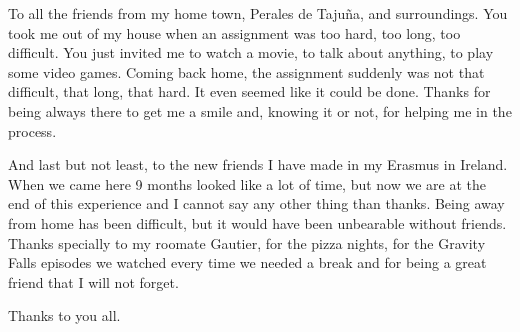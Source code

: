 To all the friends from my home town, Perales de Tajuña, and surroundings. You took me out of my house when an assignment was too hard, too long, too difficult. You just invited me to watch a movie, to talk about anything, to play some video games. Coming back home, the assignment suddenly was not that difficult, that long, that hard. It even seemed like it could be done. Thanks for being always there to get me a smile and, knowing it or not, for helping me in the process.

And last but not least, to the new friends I have made in my Erasmus in Ireland. When we came here 9 months looked like a lot of time, but now we are at the end of this experience and I cannot say any other thing than thanks. Being away from home has been difficult, but it would have been unbearable without friends. Thanks specially to my roomate Gautier, for the pizza nights, for the Gravity Falls episodes we watched every time we needed a break and for being a great friend that I will not forget.

Thanks to you all. 